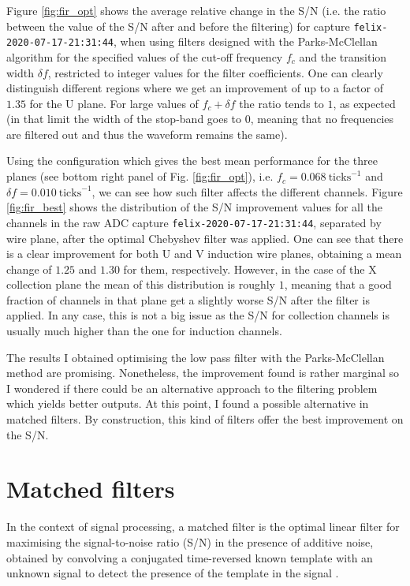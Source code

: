 Figure \ref{fig:fir_opt} shows the average relative change in the S/N (i.e. the ratio between the value of the S/N after and before the filtering) for capture \texttt{felix-2020-07-17-21:31:44}, when using filters designed with the Parks-McClellan algorithm for the specified values of the cut-off frequency $f_{c}$ and the transition width $\delta f$, restricted to integer values for the filter coefficients. One can clearly distinguish different regions where we get an improvement of up to a factor of $1.35$ for the U plane. For large values of $f_{c} + \delta f$ the ratio tends to $1$, as expected (in that limit the width of the stop-band goes to $0$, meaning that no frequencies are filtered out and thus the waveform remains the same).

Using the configuration which gives the best mean performance for the three planes (see bottom right panel of Fig. \ref{fig:fir_opt}), i.e. $f_{c} = 0.068 \ \mathrm{ticks}^{-1}$ and $\delta f = 0.010 \ \mathrm{ticks}^{-1}$, we can see how such filter affects the different channels. Figure \ref{fig:fir_best} shows the distribution of the S/N improvement values for all the channels in the raw ADC capture \texttt{felix-2020-07-17-21:31:44}, separated by wire plane, after the optimal Chebyshev filter was applied. One can see that there is a clear improvement for both U and V induction wire planes, obtaining a mean change of $1.25$ and $1.30$ for them, respectively. However, in the case of the X collection plane the mean of this distribution is roughly $1$, meaning that a good fraction of channels in that plane get a slightly worse S/N after the filter is applied. In any case, this is not a big issue as the S/N for collection channels is usually much higher than the one for induction channels.

The results I obtained optimising the low pass filter with the Parks-McClellan method are promising. Nonetheless, the improvement found is rather marginal so I wondered if there could be an alternative approach to the filtering problem which yields better outputs. At this point, I found a possible alternative in matched filters. By construction, this kind of filters offer the best improvement on the S/N.

\section{Matched filters}
\label{sec:matched_filter_matched_filter}

In the context of signal processing, a matched filter is the optimal linear filter for maximising the signal-to-noise ratio (S/N) in the presence of additive noise, obtained by convolving a conjugated time-reversed known template with an unknown signal to detect the presence of the template in the signal \cite{Turin1960}.

